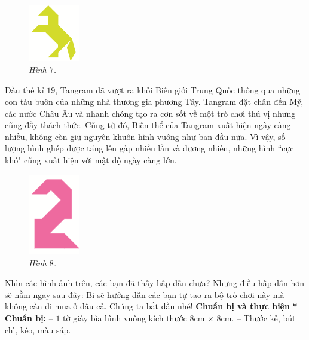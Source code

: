 	\begin{multicols}{2}
		\begin{figure}[H]
			\vspace*{5pt}	
			\captionsetup{labelformat=empty}
			\centering
			\captionsetup{justification=raggedleft}
			\includegraphics[width =0.2\textwidth]{image7}
			\caption{\small\it Hình $7$.}
			\vspace*{-10pt}
		\end{figure}
		Đầu thế kỉ $19$, Tangram đã vượt ra khỏi Biên giới Trung Quốc thông qua những con tàu buôn của những nhà thương gia phương Tây. \linebreak Tangram đặt chân đến Mỹ, các nước Châu Âu và nhanh chóng tạo ra cơn sốt về một trò chơi thú vị nhưng cũng đầy thách thức. Cũng từ đó, Biến thể của
		Tangram xuất hiện ngày càng nhiều, không còn giữ nguyên khuôn hình vuông như ban đầu nữa. Vì vậy, số lượng hình ghép được tăng lên gấp nhiều lần và đương nhiên, những hình ``cực khó" cũng xuất hiện với mật độ ngày càng lớn.
		\begin{figure}[H]
			\vspace*{-10pt}	
			\captionsetup{labelformat=empty}
			\centering
			\captionsetup{justification=raggedleft}
			\includegraphics[width =0.2\textwidth]{image8}
			\caption{\small\it Hình $8$.}
		\end{figure}
		Nhìn các hình ảnh trên, các bạn đã thấy hấp dẫn chưa? Nhưng điều hấp dẫn hơn sẽ nằm ngay sau đây: Bi sẽ hướng dẫn các bạn tự tạo ra bộ trò chơi này mà không cần đi mua ở đâu cả. Chúng ta bắt đầu nhé!
	\vskip 0.1cm
	\textbf{Chuẩn bị và thực hiện}
	\vskip 0.1cm
	\textbf{* Chuẩn bị:}
	\vskip 0.1cm
	-- $1$ tờ giấy bìa hình vuông kích thước $8$cm $\times$ $8$cm.
	\vskip 0.1cm
	-- Thước kẻ, bút chì, kéo, màu sáp.

\end{multicols}
